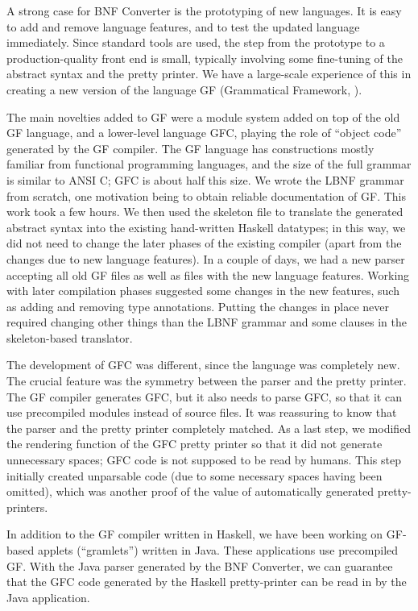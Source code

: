 
A strong case for BNF Converter is the prototyping of new
languages. It is easy to add and remove language
features, and to test the updated language immediately.
Since standard tools are used, the step from the 
prototype to a production-quality front end is small,
typically involving some fine-tuning of the abstract
syntax and the pretty printer. We have a large-scale
experience of this in creating a new version of the
language GF (Grammatical Framework, \cite{GF-paper}). 

The main novelties added to GF were 
a module system added on top of the old GF language, 
and a lower-level language GFC, playing the role of 
``object code'' generated by the GF compiler. 
The GF language has constructions mostly familiar from functional
programming languages,
and the size of the full grammar is similar
to ANSI C; GFC is about half this size. 
We wrote the LBNF grammar from scratch, one motivation
being to obtain reliable documentation of GF. 
This work took a few hours. We then used the skeleton file
to translate the generated abstract syntax into the existing
hand-written Haskell datatypes; in this way, we did not 
need to change the later phases of the existing compiler (apart from
the changes due to new language features). In a couple of days,
we had a new parser accepting all old GF files as well as 
files with the new language features. Working with later compilation
phases suggested some changes in the new features, such as adding
and removing type annotations. Putting the changes in place never required
changing other things than the LBNF grammar and some clauses in
the skeleton-based translator.

The development of GFC was different, since the language
was completely new. The crucial feature was the symmetry between
the parser and the pretty printer. The GF compiler generates 
GFC, but it also needs to parse GFC, so that it can use precompiled
modules instead of source files. It was reassuring to know
that the parser and the pretty printer completely matched.
As a last step, we modified the rendering function of the GFC
pretty printer so that it did not generate unnecessary spaces;
GFC code is not supposed to be read by humans. This step initially
created unparsable code (due to some necessary spaces having been
omitted), which was another proof of the value of automatically
generated pretty-printers.

In addition to the GF compiler written in Haskell, we have been
working on GF-based applets (``gramlets'') written in Java.
These applications use precompiled GF. With the Java parser
generated by the BNF Converter, we can guarantee that the GFC code generated
by the Haskell pretty-printer can be read in by the Java application.
